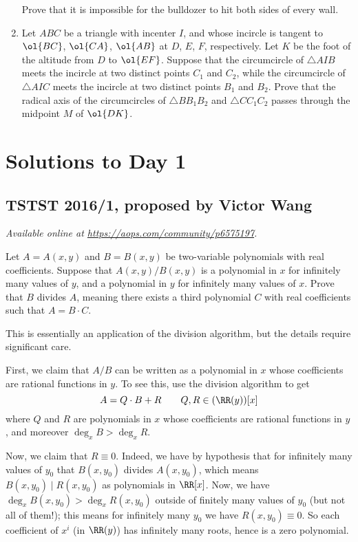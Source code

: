 \documentclass[11pt]{scrartcl}
\begin{document}
\begin{enumerate}[\bfseries 1.]
Prove that it is impossible for the bulldozer
to hit both sides of every wall.

\item %
Let $ABC$ be a triangle with incenter $I$,
and whose incircle is tangent to $\ol{BC}$, $\ol{CA}$, $\ol{AB}$
at $D$, $E$, $F$, respectively.
Let $K$ be the foot of the altitude from $D$ to $\ol{EF}$.
Suppose that the circumcircle of $\triangle AIB$
meets the incircle at two distinct points $C_1$ and $C_2$,
while the circumcircle of $\triangle AIC$ meets the incircle
at two distinct points $B_1$ and $B_2$.
Prove that the radical axis of the circumcircles of
$\triangle BB_1B_2$ and $\triangle CC_1C_2$ passes through
the midpoint $M$ of $\ol{DK}$.

\end{enumerate}
\pagebreak

\section{Solutions to Day 1}
\subsection{TSTST 2016/1, proposed by Victor Wang}
\textsl{Available online at \url{https://aops.com/community/p6575197}.}
\begin{mdframed}[style=mdpurplebox,frametitle={Problem statement}]
Let $A = A(x,y)$ and $B = B(x,y)$ be
two-variable polynomials with real coefficients.
Suppose that $A(x,y)/B(x,y)$ is a polynomial in $x$
for infinitely many values of $y$,
and a polynomial in $y$ for infinitely many values of $x$.
Prove that $B$ divides $A$, meaning there exists a third polynomial $C$
with real coefficients such that $A = B \cdot C$.
\end{mdframed}
This is essentially an application of the division algorithm,
but the details require significant care.

First, we claim that $A/B$ can be written as a polynomial in $x$
whose coefficients are rational functions in $y$.
To see this, use the division algorithm to get
\[ A = Q \cdot B + R \qquad Q,R \in (\RR(y))[x] \]
where $Q$ and $R$ are polynomials in $x$
whose coefficients are rational functions in $y$,
and moreover $\deg_x B > \deg_x R$.

Now, we claim that $R \equiv 0$.
Indeed, we have by hypothesis that for infinitely many values of $y_0$
that $B(x,y_0)$ divides $A(x, y_0)$,
which means $B(x,y_0) \mid R(x,y_0)$ as polynomials in $\RR[x]$.
Now, we have $\deg_x B(x,y_0) > \deg_x R(x,y_0)$
outside of finitely many values of $y_0$ (but not all of them!);
this means for infinitely many $y_0$ we have $R(x,y_0) \equiv 0$.
So each coefficient of $x^i$ (in $\RR(y)$)
has infinitely many roots, hence is a zero polynomial.
\end{document}
